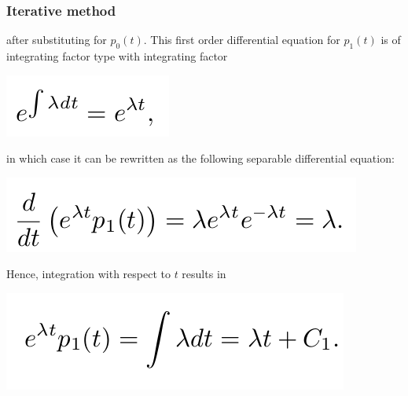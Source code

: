 \documentclass[spanish]{beamer}
\begin{document}
\begin{frame}
\frametitle{Iterative method}
after substituting for $p_{0} (t)$. This first order differential equation for $p_{1} (t)$ is of integrating factor type with integrating factor

\begin{center}
\includegraphics[scale=0.4]{im25}
\end{center}

in which case it can be rewritten as the following separable differential equation:

\begin{center}
\includegraphics[scale=0.4]{im26}
\end{center}

Hence, integration with respect to $t$ results in

\begin{center}
\includegraphics[scale=0.35]{im28}
\end{center}

\end{frame}
\end{document}
